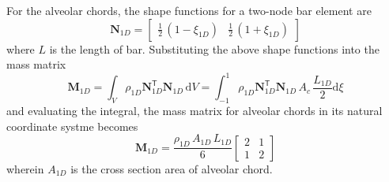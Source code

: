 For the alveolar chords, the shape functions for a two-node bar element are
\begin{equation}
\mathbf{N}_{1D} = \begin{bmatrix}
\frac{1}{2} \, (1 - \xi_{1D}) &  \frac{1}{2} \, (1 + \xi_{1D})
\end{bmatrix} 
\end{equation}
where $L$ is the length of bar. Substituting the above shape functions into the mass matrix 
\begin{equation}
\mathbf{M}_{1D} = \int_{V} \rho_{1D} \mathbf{N}_{1D}^{\mathsf{T}} \mathbf{N}_{1D} \, \mathrm{d} V  = \int_{-1}^{1} \rho_{1D} \mathbf{N}_{1D}^{\mathsf{T}} \mathbf{N}_{1D} \, A_c \,  \frac{L_{1D}}{2} \mathrm{d} \xi
\end{equation}
and evaluating the integral, the mass matrix for alveolar chords in its natural coordinate systme becomes
\begin{equation}
\mathbf{M}_{1D}  = \frac{\rho_{1D} \, A_{1D} \, L_{1D}}{6}\begin{bmatrix}
2 & 1 \\
1 & 2
\end{bmatrix} 
\label{MassMatrix1D}
\end{equation}
wherein $A_{1D}$ is the cross section area of alveolar chord.

